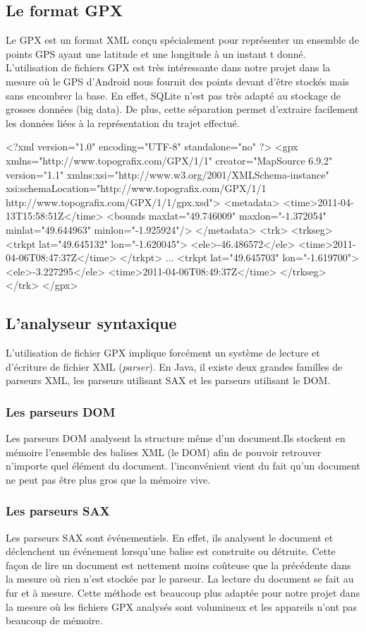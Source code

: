\subsection{Le format GPX}
Le GPX est un format XML conçu spécialement pour représenter un ensemble de points GPS ayant une latitude et une longitude à un instant t donné. L'utilisation de fichiers GPX est très intéressante dans notre projet dans la mesure où le GPS d'Android nous fournit des points devant d'être stockés mais sans encombrer la base. En effet, SQLite n'est pas très adapté au stockage de grosses données (big data). De plus, cette séparation permet d'extraire facilement les données liées à la représentation du trajet effectué.

\begin{xml}
<?xml version="1.0" encoding="UTF-8" standalone="no" ?>
<gpx xmlns="http://www.topografix.com/GPX/1/1" creator="MapSource 6.9.2" version="1.1" xmlns:xsi="http://www.w3.org/2001/XMLSchema-instance" xsi:schemaLocation="http://www.topografix.com/GPX/1/1 http://www.topografix.com/GPX/1/1/gpx.xsd">
  <metadata>
    <time>2011-04-13T15:58:51Z</time>
    <bounds maxlat="49.746009" maxlon="-1.372054" minlat="49.644963" minlon="-1.925924"/>
  </metadata>
  <trk>
    <trkseg>
      <trkpt lat="49.645132" lon="-1.620045">
        <ele>-46.486572</ele>
        <time>2011-04-06T08:47:37Z</time>
      </trkpt>
     ...
      <trkpt lat="49.645703" lon="-1.619700">
        <ele>-3.227295</ele>
        <time>2011-04-06T08:49:37Z</time>
    </trkseg>
  </trk>
</gpx>
\end{xml}

\subsection{L'analyseur syntaxique}
L'utilisation de fichier GPX implique forcément un système de lecture et d'écriture de fichier XML (\textit{parser}). En Java, il existe deux grandes familles de parseurs XML, les parseurs utilisant SAX et les parseurs utilisant le DOM.

\subsubsection{Les parseurs DOM}
Les parseurs DOM analysent la structure même d'un document.Ils stockent en mémoire l'ensemble des balises XML (le DOM) afin de pouvoir retrouver n'importe quel élément du document. l'inconvénient vient du fait qu'un document ne peut pas être plus gros que la mémoire vive. 

\subsubsection{Les parseurs SAX}
Les parseurs SAX sont événementiels. En effet, ils analysent le document et déclenchent un événement lorsqu'une balise est construite ou détruite. Cette façon de lire un document est nettement moins coûteuse que la précédente dans la mesure où rien n'est stockée par le parseur. La lecture du document se fait au fur et à mesure. Cette méthode est beaucoup plus adaptée pour notre projet dans la mesure où les fichiers GPX analysés sont volumineux et les appareils n'ont pas beaucoup de mémoire. 
